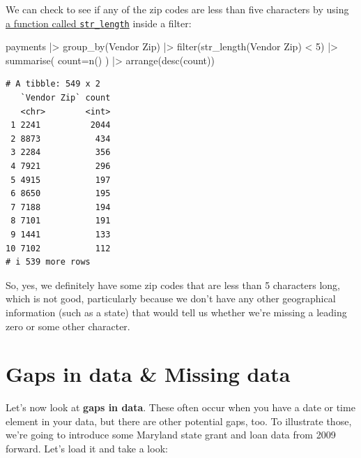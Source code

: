 \documentclass[
  letterpaper,
  DIV=11,
  numbers=noendperiod]{scrreprt}
\newenvironment{Shaded}{\begin{snugshade}}{\end{snugshade}}
\newcommand{\AttributeTok}[1]{\textcolor[rgb]{0.40,0.45,0.13}{#1}}
\newcommand{\DecValTok}[1]{\textcolor[rgb]{0.68,0.00,0.00}{#1}}
\newcommand{\FunctionTok}[1]{\textcolor[rgb]{0.28,0.35,0.67}{#1}}
\newcommand{\NormalTok}[1]{\textcolor[rgb]{0.00,0.23,0.31}{#1}}
\newcommand{\SpecialCharTok}[1]{\textcolor[rgb]{0.37,0.37,0.37}{#1}}
\newcommand{\StringTok}[1]{\textcolor[rgb]{0.13,0.47,0.30}{#1}}
\begin{document}
We can check to see if any of the zip codes are less than five
characters by using
\href{https://stringr.tidyverse.org/reference/str_length.html}{a
function called \texttt{str\_length}} inside a filter:

\begin{Shaded}
\begin{Highlighting}[]
\NormalTok{payments }\SpecialCharTok{|\textgreater{}}
  \FunctionTok{group\_by}\NormalTok{(}\StringTok{\textasciigrave{}}\AttributeTok{Vendor Zip}\StringTok{\textasciigrave{}}\NormalTok{) }\SpecialCharTok{|\textgreater{}}
  \FunctionTok{filter}\NormalTok{(}\FunctionTok{str\_length}\NormalTok{(}\StringTok{\textasciigrave{}}\AttributeTok{Vendor Zip}\StringTok{\textasciigrave{}}\NormalTok{) }\SpecialCharTok{\textless{}} \DecValTok{5}\NormalTok{) }\SpecialCharTok{|\textgreater{}} 
  \FunctionTok{summarise}\NormalTok{(}
    \AttributeTok{count=}\FunctionTok{n}\NormalTok{()}
\NormalTok{  ) }\SpecialCharTok{|\textgreater{}}
  \FunctionTok{arrange}\NormalTok{(}\FunctionTok{desc}\NormalTok{(count))}
\end{Highlighting}
\end{Shaded}

\begin{verbatim}
# A tibble: 549 x 2
   `Vendor Zip` count
   <chr>        <int>
 1 2241          2044
 2 8873           434
 3 2284           356
 4 7921           296
 5 4915           197
 6 8650           195
 7 7188           194
 8 7101           191
 9 1441           133
10 7102           112
# i 539 more rows
\end{verbatim}

So, yes, we definitely have some zip codes that are less than 5
characters long, which is not good, particularly because we don't have
any other geographical information (such as a state) that would tell us
whether we're missing a leading zero or some other character.

\hypertarget{gaps-in-data-missing-data}{%
\section{Gaps in data \& Missing data}\label{gaps-in-data-missing-data}}

Let's now look at \textbf{gaps in data}. These often occur when you have
a date or time element in your data, but there are other potential gaps,
too. To illustrate those, we're going to introduce some Maryland state
grant and loan data from 2009 forward. Let's load it and take a look:
\end{document}

